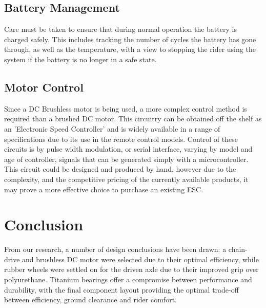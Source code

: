 \documentclass[journal,10pt]{IEEEtran}
\begin{document}
    \subsection{Battery Management}
    	Care must be taken to ensure that during normal operation the battery is charged safely.
    	This includes tracking the number of cycles the battery has gone through, as well as the temperature, with a view to stopping the rider using the system if the battery is no longer in a safe state.
    	
    \subsection{Motor Control}
    		Since a DC Brushless motor is being used, a more complex control method is required than a brushed DC motor.
    		This circuitry can be obtained off the shelf as an 'Electronic Speed Controller' and is widely available in a range of specifications due to its use in the remote control models.
    		Control of these circuits is by pulse width modulation, or serial interface, varying by model and age of controller, signals that can be generated simply with a microcontroller.
    		This circuit could be designed and produced by hand, however due to the complexity, and the competitive pricing of the currently available products, it may prove a more effective choice to purchase an existing ESC.
\section{Conclusion}
From our research, a number of design conclusions have been drawn: a chain-drive and brushless DC motor were selected due to their optimal efficiency, while rubber wheels were settled on for the driven axle due to their improved grip over polyurethane. Titanium bearings offer a compromise between performance and durability, with the final component layout providing the optimal trade-off between efficiency, ground clearance and rider comfort.
\end{document}
